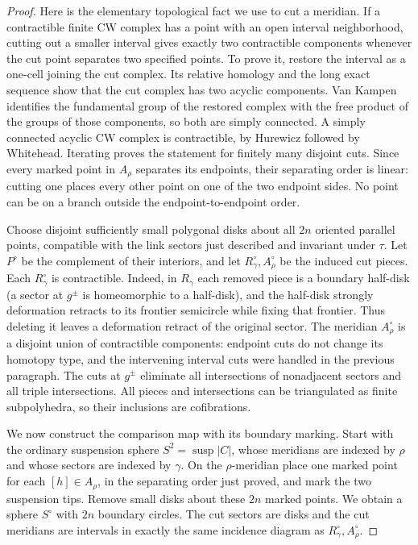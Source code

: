 \documentclass[11pt,a4paper]{article}
\begin{document}
\begin{proof}
Here is the elementary topological fact we use to cut a meridian. If a
contractible finite CW complex has a point with an open interval
neighborhood, cutting out a smaller interval gives exactly two contractible
components whenever the cut point separates two specified points. To prove
it, restore the interval as a one-cell joining the cut complex. Its relative
homology and the long exact sequence show that the cut complex has two
acyclic components. Van Kampen identifies the fundamental group of the
restored complex with the free product of the groups of those components,
so both are simply connected. A simply connected acyclic CW complex is
contractible, by Hurewicz followed by Whitehead. Iterating proves the
statement for finitely many disjoint cuts. Since every marked point in
$A_\rho$ separates its endpoints, their separating order is linear: cutting
one places every other point on one of the two endpoint sides. No point
can be on a branch outside the endpoint-to-endpoint order.

Choose disjoint sufficiently small polygonal disks about all $2n$ oriented
parallel points, compatible with the link sectors just described and
invariant under $\tau$. Let $P^\circ$ be the complement of their interiors,
and let $R_\gamma^\circ,A_\rho^\circ$ be the induced cut pieces. Each
$R_\gamma^\circ$ is contractible. Indeed, in $R_\gamma$ each removed piece
is a boundary half-disk (a sector at $g^\pm$ is homeomorphic to a half-disk),
and the half-disk strongly deformation retracts to its frontier semicircle
while fixing that frontier. Thus deleting it leaves a deformation retract
of the original sector. The meridian $A_\rho^\circ$ is a disjoint union of
contractible components: endpoint cuts do not change its homotopy type,
and the intervening interval cuts were handled in the previous paragraph.
The cuts at $g^\pm$ eliminate all intersections of nonadjacent sectors and
all triple intersections. All pieces and intersections can be triangulated
as finite subpolyhedra, so their inclusions are cofibrations.

We now construct the comparison map with its boundary marking. Start with
the ordinary suspension sphere $S^2=\operatorname{susp}|C|$, whose meridians
are indexed by $\rho$ and whose sectors are indexed by $\gamma$. On the
$\rho$-meridian place one marked point for each $[h]\in A_\rho$, in the
separating order just proved, and mark the two suspension tips. Remove small
disks about these $2n$ marked points. We obtain a sphere $S^\circ$ with
$2n$ boundary circles. The cut sectors are disks and the cut meridians are
intervals in exactly the same incidence diagram as
$R_\gamma^\circ,A_\rho^\circ$.


\end{proof}
\end{document}
